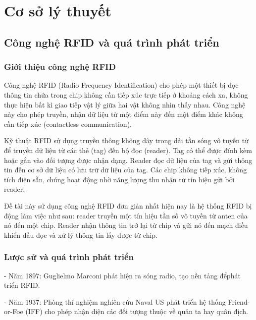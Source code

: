\chapter{Cơ sở lý thuyết}
\section{Công nghệ RFID và quá trình phát triển}
\subsection{Giới thiệu công nghệ RFID}
Công nghệ RFID (Radio Frequency Identification) cho phép một thiết bị đọc thông tin chứa trong chip không cần tiếp xúc trực tiếp ở khoảng cách xa,
không thực hiện bất kì giao tiếp vật lý giữa hai vật không nhìn thấy nhau.
Công nghệ này cho phép truyền, nhận dữ liệu từ một điểm này đến một điểm khác không cần tiếp xúc (contactless communication).

Kỹ thuật RFID sử dụng truyền thông không dây trong dải tần sóng vô tuyến từ để truyền dữ liệu từ các thẻ (tag) đến bộ đọc (reader).
Tag có thể được đính kèm hoặc gắn vào đối tượng được nhận dạng.
Reader đọc dữ liệu của tag và gửi thông tin đến cơ sở dữ liệu có lưu trữ dữ liệu của tag.
Các chip không tiếp xúc, không tích điện sẵn, chúng hoạt động nhờ năng lượng thu nhận từ tín hiệu gửi bởi reader.

Đề tài này sử dụng công nghệ RFID đơn giản nhất hiện nay là hệ thống RFID bị động làm việc như sau:
reader truyền một tín hiệu tần số vô tuyến từ anten của nó đến một chip.
Reader nhận thông tin trở lại từ chip và gửi nó đến mạch điều khiển đầu đọc và xử lý thông tin lấy được từ chip.
\subsection{Lược sử và quá trình phát triển}
- Năm 1897: Guglielmo Marconi phát hiện ra sóng radio, tạo nền tảng đểphát triển RFID.

- Năm 1937: Phòng thí nghiệm nghiên cứu Naval US phát triển hệ thống Friend-or-Foe (IFF) cho phép nhận diện các đối tượng thuộc về quân ta hay quân địch.

